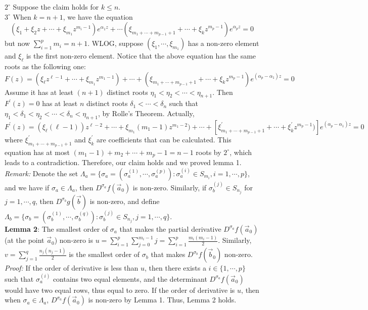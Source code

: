 \documentclass[12pt]{article}
\begin{document}
$2^{\circ}$ Suppose the claim holds for $k\leqslant n$.\\
$3^{\circ}$ When $k=n+1$, we have the equation $$(\xi_{1}+\xi_{2}z+\cdots+\xi_{m_1}z^{m_{i}-1})e^{\alpha_{1}z}+\cdots(\xi_{m_{1}+\cdots+m_{p-1}+1}+\cdots+\xi_{k}z^{m_{p}-1})e^{\alpha_{p}z}=0$$ but now $\sum_{i=1}^{p}m_{i}=n+1$. WLOG, suppose $(\xi_{1},\cdots,\xi_{m_{1}})$ has a non-zero element and $\xi_{\ell}$ is the first non-zero element. Notice that the above equation has the same roots as the following one:
$$F(z)=(\xi_{\ell}z^{\ell-1}+\cdots+\xi_{m_1}z^{m_1-1})+\cdots+(\xi_{m_1+\cdots+m_{p-1}+1}+\cdots+\xi_{k}z^{m_{p}-1})e^{(\alpha_{p}-\alpha_{1})z}=0$$
Assume it has at least $(n+1)$ distinct roots $\eta_{1}<\eta_{2}<\cdots<\eta_{n+1}$. Then $F^{\prime}(z)=0$ has at least $n$ distinct roots $\delta_{1}<\cdots<\delta_{n}$ such that $\eta_{1}<\delta_{1}<\eta_{2}<\cdots<\delta_{n}<\eta_{n+1}$, by Rolle's Theorem. Actually, $F^{\prime}(z)=(\xi_{\ell}(\ell-1))z^{\ell-2}+\cdots+\xi_{m_1}(m_1-1)z^{m_{1}-2})+\cdots+[\xi_{m_1+\cdots+m_{p-1}+1}^{\prime}+\cdots+\xi_{k}^{\prime}z^{m_{p}-1})]e^{(\alpha_{p}-\alpha_{1})z}=0$
where $\xi_{m_1+\cdots+m_{p-1}+1}^{\prime}$ and $\xi_{k}^{\prime}$ are coefficients that can be calculated. This equation has at most $(m_1-1)+m_2+\cdots+m_{p}-1=n-1$ roots by $2^{\circ}$, which leads to a contradiction. Therefore, our claim holds and we proved lemma 1.\\
\emph{Remark:} Denote the set $\Lambda_{a}=\{\sigma_{a}=(\sigma_{a}^{(1)},\cdots,\sigma_{a}^{(p)}):\sigma_{a}^{(i)}\in S_{m_{i}}, i=1,\cdots,p\}$, and we have if $\sigma_{a}\in \Lambda_{a}$, then $D^{\sigma_{a}}f(\vec{a}_{0})$ is non-zero. Similarly, if $\sigma^{(j)}_{b}\in S_{n_j}$ for $j=1,\cdots,q$, then $D^{\sigma_{b}}g(\vec{b})$ is non-zero, and define $\Lambda_{b}=\{\sigma_{b}=(\sigma_{b}^{(1)},\cdots,\sigma_{b}^{(q)}):\sigma_{b}^{(j)}\in S_{n_{j}}, j=1,\cdots,q\}$.\\
\textbf{Lemma 2}: The smallest order of $\sigma_{a}$ that makes the partial derivative $D^{\sigma_{a}}f(\vec{a}_{0})$(at the point $\vec{a}_{0}$) non-zero is $u=\sum_{i=1}^{p}\sum_{j=0}^{m_{i}-1}j=\sum_{i=1}^{p}\frac{m_{i}(m_{i}-1)}{2}$. Similarly, $v=\sum_{j=1}^{q}\frac{n_{j}(n_{j}-1)}{2}$ is the smallest order of $\sigma_{b}$ that makes $D^{\sigma_{b}}f(\vec{b}_{0})$ non-zero.\\
\emph{Proof:} If the order of derivative is less than $u$, then there exists a $i\in\{1,\cdots,p\}$ such that $\sigma_{a}^{(i)}$ contains two equal elements, and the determinant $D^{\sigma_{a}}f(\vec{a}_{0})$ would have two equal rows, thus equal to zero. If the order of derivative is $u$, then when $\sigma_{a}\in\Lambda_{a}$, $D^{\sigma_{a}}f(\vec{a}_{0})$ is non-zero by Lemma 1. Thus, Lemma 2 holds.\\
\end{document}

